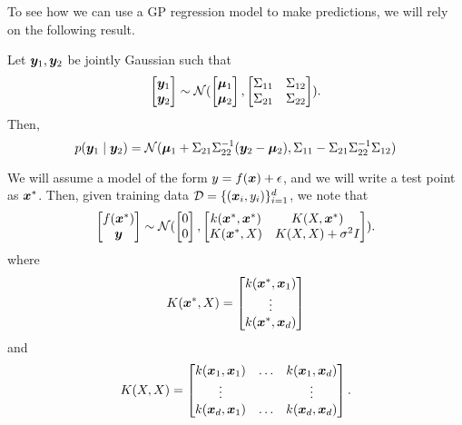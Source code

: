 To see how we can use a GP regression model to make predictions, we will rely on the following result.
\begin{lemma}
\label{lem:gp1}
Let $\bm{y}_1, \bm{y}_2$ be jointly Gaussian such that 
\begin{equation}
    \begin{bmatrix}
    \bm{y}_1\\
    \bm{y}_2
    \end{bmatrix} \sim \mathcal{N}(\begin{bmatrix}
    \bm{\mu}_1\\
    \bm{\mu}_2
    \end{bmatrix}, 
    \begin{bmatrix}
    \Sigma_{11} & \Sigma_{12}\\
    \Sigma_{21} & \Sigma_{22}
    \end{bmatrix}
    ).
\end{equation}
Then,
\begin{equation}
    p(\bm{y}_1 \mid \bm{y}_2) = \mathcal{N}(\bm{\mu}_1 + \Sigma_{21} \Sigma_{22}^{-1} (\bm{y}_2 - \bm{\mu}_2), \Sigma_{11} - \Sigma_{21} \Sigma_{22}^{-1} \Sigma_{12})
\end{equation}
\end{lemma}
We will assume a model of the form $y = f(\bm{x}) + \epsilon$, and we will write a test point as $\bm{x}^*$. Then, given training data $\mathcal{D} = \{(\bm{x}_i, y_i)\}_{i=1}^{d}$, we note that 
\begin{equation}
    \begin{bmatrix}
    f(\bm{x}^*)\\
    \bm{y}
    \end{bmatrix} \sim \mathcal{N}(\begin{bmatrix}
    0\\
    0
    \end{bmatrix}, 
    \begin{bmatrix}
    k(\bm{x}^*, \bm{x}^*) & K(X, \bm{x}^*)\\
    K(\bm{x}^*, X) & K(X, X) + \sigma^2 I
    \end{bmatrix}
    ).
\end{equation}
where 
\begin{equation}
    K(\bm{x}^*, X) = \begin{bmatrix}
    k(\bm{x}^*, \bm{x}_1)\\
    \vdots\\
    k(\bm{x}^*, \bm{x}_{d})
    \end{bmatrix}
\end{equation}
and 
\begin{equation}
    K(X, X) = \begin{bmatrix}
    k(\bm{x}_1, \bm{x}_1) & \ldots & k(\bm{x}_1, \bm{x}_{d})\\
    \vdots & & \vdots\\
    k(\bm{x}_{d}, \bm{x}_1) & \ldots & k(\bm{x}_{d}, \bm{x}_{d})\\
    \end{bmatrix}.
\end{equation}
